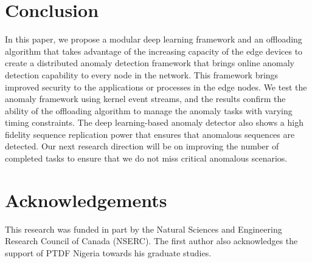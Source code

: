 \section{Conclusion}
\label{sec:conclusion}
In this paper, we propose a modular deep learning framework 
and an offloading algorithm that takes advantage of the 
increasing capacity of the edge devices to create a 
distributed anomaly detection framework that brings online 
anomaly detection capability to every node in the network. 
This framework brings improved security to the applications 
or processes in the edge nodes. We test the anomaly framework 
using kernel event streams, and the results confirm the 
ability of the offloading algorithm to manage the anomaly 
tasks with varying timing constraints. The deep 
learning-based anomaly detector also shows a high fidelity 
sequence replication power that ensures that anomalous 
sequences are detected. Our next research direction will be 
on improving the number of completed tasks to ensure that we 
do not miss critical anomalous scenarios.

\section*{Acknowledgements}
This research was funded in part by the Natural Sciences and Engineering Research Council of Canada (NSERC). The first author also acknowledges the support of PTDF Nigeria towards his graduate studies.